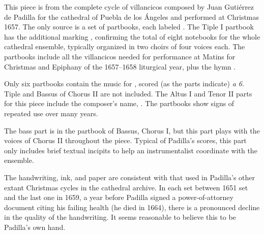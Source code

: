 
\begin{notesources}

\begin{source}
\end{source}

\begin{source}
\end{source}

\end{notesources}

This piece is from the complete cycle of villancicos composed by Juan Gutiérrez de Padilla for the cathedral of Puebla de los Ángeles and performed at Christmas 1657.%
  \autocites{Puebla:Microfilm}{Stanford:Catalog}
  {Mauleon:PadillaPalafox}{Hurtado:Padilla}{Stevenson:Padilla}
The only source is a set of partbooks, each labeled .
The Tiple I partbook has the additional marking , confirming the total of eight notebooks for the whole cathedral ensemble, typically organized in two choirs of four voices each.
The partbooks include all the villancicos needed for performance at Matins for Christmas and Epiphany of the 1657--1658 liturgical year, plus the hymn .

Only six partbooks contain the music for , scored (as the parts indicate) \emph{a 6}.
Tiple and Bassus of Chorus II are not included.
The Altus I and Tenor II parts for this piece include the composer's name, .
The partbooks show signs of repeated use over many years.

The bass part is in the partbook of Bassus, Chorus I, but this part plays with the voices of Chorus II throughout the piece.
Typical of Padilla's scores, this part only includes brief textual incipits to help an instrumentalist coordinate with the ensemble.

The handwriting, ink, and paper are consistent with that used in Padilla's other extant Christmas cycles in the cathedral archive.
In each set between 1651 set and the last one in 1659, a year before Padilla signed a power-of-attorney document citing his failing health\autocite{Mauleon:PadillaCivil} (he died in 1664), there is a pronounced decline in the quality of the handwriting.
It seems reasonable to believe this to be Padilla's own hand.

